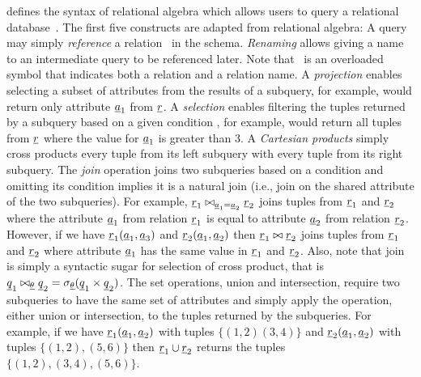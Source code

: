 







 defines the syntax of 
relational algebra which allows users to query a relational database~\cite{AliceBook}.
%
The first five constructs are adapted from relational algebra:
%
A query may simply \emph{reference} a relation \pRel\ in the schema.
\emph{Renaming} allows giving a name to an intermediate query to be referenced
 later. Note that \pRel\ is an overloaded symbol that indicates both a relation
 and a relation name. 
%
A \emph{projection} enables selecting a subset of attributes from the results
of a subquery, for example, \vPrj[\pAtt_1]{\pRel} would return only attribute $\pAtt_1$
from $\pRel$.
%
A \emph{selection} enables filtering the tuples returned by a subquery based on a
given condition \pCond, for example, \vSel[\pAtt_1 > 3]{\pRel} would return all tuples
from $\pRel$ where the value for $\pAtt_1$ is greater than 3.
%
A \emph{Cartesian products} simply cross products every tuple from its
left subquery with every tuple from its right subquery. 
%
The \emph{join} operation joins two subqueries based on a condition and
omitting its condition implies it is a natural join (i.e., join on the
shared attribute of the two subqueries).
For example, $\pRel_1 \bowtie_{\pAtt_1 = \pAtt_2} \pRel_2$ joins tuples from $\pRel_1$ 
and $\pRel_2$ where the attribute $\pAtt_1$ from relation $\pRel_1$ is equal to
attribute $\pAtt_2$ from relation $\pRel_2$. However, if we have $\pRel_1(\pAtt_1, \pAtt_3)$
and $\pRel_2 (\pAtt_1, \pAtt_2)$ then
$\pRel_1 \bowtie \pRel_2$ joins tuples from $\pRel_1$ and $\pRel_2$ where
attribute $\pAtt_1$ has the same value in $\pRel_1$ and $\pRel_2$. 
%
Also, note that join is simply a syntactic sugar for selection of cross product,
that is $\pQ_1 \bowtie_{\pCond} \pQ_2 = \vSel [\pCond] {(\pQ_1 \times \pQ_2)}$.
%
The set operations, union and intersection, require two subqueries to have the same set of attributes
and simply apply the operation, either union or intersection, to the tuples returned by
the subqueries.
For example, if we have $\pRel_1(\pAtt_1, \pAtt_2)$ with 
tuples $\{(1,2)(3,4)\}$
and $\pRel_2(\pAtt_1, \pAtt_2)$ with tuples $\{(1,2),(5,6) \}$
then $\pRel_1 \cup \pRel_2 $ returns the tuples $\{(1,2), (3,4), (5,6)\}$.

